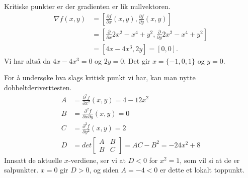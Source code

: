 \documentclass[11pt, a4paper, norsk]{NTNUoving}
\begin{document}
\begin{oppgave}
\begin{punkt}
    Kritiske punkter er der gradienten er lik nullvektoren. 
    \begin{align*}
        \nabla f(x, y) &= \left[\frac{\partial f}{\partial x}(x, y), \frac{\partial f}{\partial y}(x, y)\right]
        \\&=\left[\frac{\partial }{\partial x}2x^2 -x^4 +y^2, \frac{\partial }{\partial y}2x^2 -x^4 +y^2\right]
        \\&= \left[4x-4x^3, 2y\right] = \left[0, 0\right].
    \end{align*}
    Vi har altså da $4x-4x^3=0$ og $2y=0$. Det gir $x=\{-1, 0, 1\}$ og $y=0$. 
    
    For å undersøke hva slags kritisk punkt vi har, kan man nytte dobbeltderiverttesten. 
    \begin{align*}
        A&=\frac{\partial^2 f}{\partial x^2}(x, y)=4-12x^2\\
        B&=\frac{\partial^2 f}{\partial x \partial y}(x, y) =0\\
        C&=\frac{\partial^2 f}{\partial y^2}(x, y)=2\\
        D &=det \begin{bmatrix} A & B \\ B & C \end{bmatrix} = AC -B^2= -24x^2 +8
    \end{align*}
    Innsatt de aktuelle $x$-verdiene, ser vi at $D<0$ for $x^2=1$, som vil si at de er salpunkter. $x=0$ gir $D>0$, og siden $A=-4<0$ er dette et lokalt toppunkt. 
    \end{punkt}
    

\end{oppgave}
\end{document}

